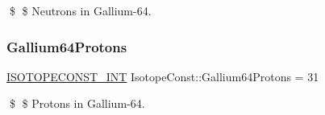 \$ \$ Neutrons in Gallium-\/64. \mbox{\label{group___isotope_const-_gallium-_ga64_gae4f7a89675315bd1e0f6c88c157d4bd7}} 
\subsubsection{\texorpdfstring{Gallium64\+Protons}{Gallium64Protons}}
{\footnotesize\ttfamily \mbox{\hyperlink{group___isotope_const-_macros_ga5f18360b3e99483a35c32d789e62621c}{I\+S\+O\+T\+O\+P\+E\+C\+O\+N\+S\+T\+\_\+\+I\+NT}} Isotope\+Const\+::\+Gallium64\+Protons = 31}

\$ \$ Protons in Gallium-\/64. 